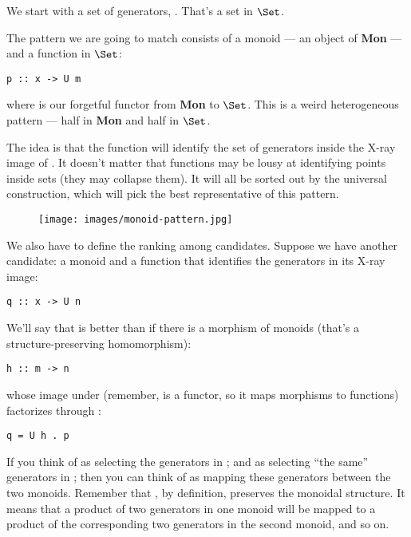 We start with a set of generators, . That's a set in
$\Set$.

The pattern we are going to match consists of a monoid  --- an
object of \textbf{Mon} --- and a function  in $\Set$:

\begin{Verbatim}[commandchars=\\\{\}]
p :: x -> U m
\end{Verbatim}
where  is our forgetful functor from \textbf{Mon} to
$\Set$. This is a weird heterogeneous pattern --- half in
\textbf{Mon} and half in $\Set$.

The idea is that the function  will identify the set of
generators inside the X-ray image of . It doesn't matter that
functions may be lousy at identifying points inside sets (they may
collapse them). It will all be sorted out by the universal construction,
which will pick the best representative of this pattern.

\begin{figure}[H]
\centering
\texttt{[image: images/monoid-pattern.jpg]}
\end{figure}

\noindent
We also have to define the ranking among candidates. Suppose we have
another candidate: a monoid  and a function that identifies
the generators in its X-ray image:

\begin{Verbatim}[commandchars=\\\{\}]
q :: x -> U n
\end{Verbatim}
We'll say that  is better than  if there is a
morphism of monoids (that's a structure-preserving homomorphism):

\begin{Verbatim}[commandchars=\\\{\}]
h :: m -> n
\end{Verbatim}
whose image under  (remember,  is a functor, so it
maps morphisms to functions) factorizes through :

\begin{Verbatim}[commandchars=\\\{\}]
q = U h . p
\end{Verbatim}
If you think of  as selecting the generators in ;
and  as selecting ``the same'' generators in ; then
you can think of  as mapping these generators between the two
monoids. Remember that , by definition, preserves the monoidal
structure. It means that a product of two generators in one monoid will
be mapped to a product of the corresponding two generators in the second
monoid, and so on.

